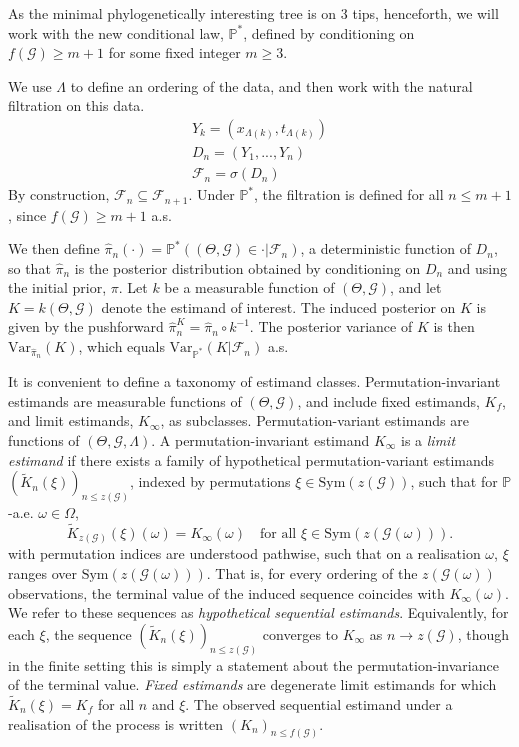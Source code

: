 \documentclass{article}
\newcommand{\Var}{\mathrm{Var}_{\mathbb{P}^*} }
\begin{document}
As the minimal phylogenetically interesting tree is on 3 tips, henceforth, we will work with the new conditional law, $\mathbb{P}^*$, defined by conditioning on $f(\mathcal{G})\geq m+1$ for some fixed integer $m \geq3$.

We use $\Lambda$ to define an ordering of the data, and then work with the natural filtration on this data.
\begin{gather*}
    Y_k=(x_{\Lambda(k)},t_{\Lambda(k)})\\
    D_n = (Y_1,...,Y_n)\\
    \mathcal{F}_n=\sigma(D_n)
\end{gather*}
By construction, $\mathcal F_n\subseteq \mathcal F_{n+1}$. Under $\mathbb P^*$, the filtration is defined for all $n\le m+1$, since $f(\mathcal G)\ge m+1$ a.s.

We then define $\hat{\pi}_n(\cdot)=\mathbb{P}^*((\Theta,\mathcal{G}) \in \cdot|\mathcal{F}_n)$, a deterministic function of $D_n$, so that $\hat{\pi}_n$ is the posterior distribution obtained by conditioning on $D_n$ and using the initial prior, $\pi$. Let $k$ be a measurable function of $(\Theta,\mathcal{G})$, and let $K=k(\Theta,\mathcal{G})$ denote the estimand of interest. The induced posterior on $K$ is given by the pushforward $\hat{\pi}_n^K=\hat{\pi}_n\circ k^{-1}$. The posterior variance of $K$ is then $\mathrm{Var}_{\hat{\pi}_n}(K)$, which equals $\Var(K|\mathcal{F}_n)$ a.s.

It is convenient to define a taxonomy of estimand classes. Permutation-invariant estimands are measurable functions of $(\Theta,\mathcal G)$, and include fixed estimands, $K_f$, and limit estimands, $K_\infty$, as subclasses. Permutation-variant estimands are functions of $(\Theta,\mathcal G,\Lambda)$.
A permutation-invariant estimand $K_\infty$ is a \textit{limit estimand} if there exists a family of hypothetical permutation-variant estimands $(\widetilde K_n(\xi))_{n \le z(\mathcal{G})}$, indexed by permutations $\xi \in \mathrm{Sym}(z(\mathcal{G}))$, such that for $\mathbb{P}$-a.e. $\omega \in \Omega$,
\[
\widetilde K_{z(\mathcal{G})}(\xi)(\omega) = K_\infty(\omega)
\quad \text{for all } \xi \in \mathrm{Sym}(z(\mathcal{G}(\omega))).
\]
with permutation indices are understood pathwise, such that on a realisation $\omega$, $\xi$ ranges over $\mathrm{Sym}(z(\mathcal G(\omega)))$. That is, for every ordering of the $z(\mathcal{G}(\omega))$ observations, the terminal value of the induced sequence coincides with $K_\infty(\omega)$. We refer to these sequences as \textit{hypothetical sequential estimands}.
Equivalently, for each $\xi$, the sequence $(\widetilde K_n(\xi))_{n \le z(\mathcal{G})}$ converges to $K_\infty$ as $n \to z(\mathcal{G})$, though in the finite setting this is simply a statement about the permutation-invariance of the terminal value.
\textit{Fixed estimands} are degenerate limit estimands for which $\widetilde K_n(\xi)=K_f$ for all $n$ and $\xi$. The observed sequential estimand under a realisation of the process is written $(K_n)_{n \le f(\mathcal G)}$.
\end{document}
